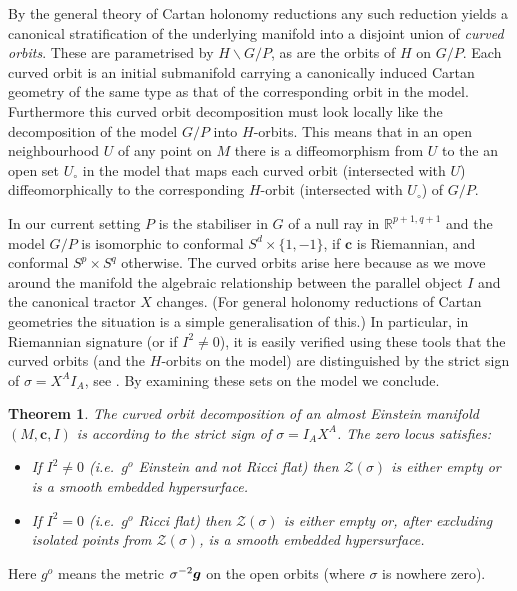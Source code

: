 \documentclass[a4paper,12pt]{amsart}
\newcommand{\cZ}{\mathcal{Z}}
\newcommand{\cc}{\boldsymbol{c}}
\def\bg{\mbox{\boldmath $g$}}
\newcommand{\si}{\sigma}
\newtheorem{theorem}{Theorem}[section]
\theoremstyle{remark}
\begin{document}
By the general theory of Cartan holonomy reductions \cite{CGH} any
such reduction yields a canonical stratification of the underlying
manifold into a disjoint union of {\em curved orbits}. These are
parametrised by $H\backslash G/P$, as are the orbits of $H$ on
$G/P$. Each curved orbit is an initial submanifold carrying a
canonically induced Cartan geometry of the same type as that of the
corresponding orbit in the model. Furthermore this curved orbit
decomposition must look locally like the decomposition of the model
$G/P$ into $H$-orbits. This means that in an open neighbourhood $U$ of
any point on $M$ there is a diffeomorphism from $U$ to the an open set
$U_\circ$ in the model that maps each curved orbit (intersected with
$U$) diffeomorphically to the corresponding $H$-orbit (intersected
with $U_\circ$) of $G/P$.

In our current setting $P$ is the stabiliser in $G$ of a null ray in $\mathbb{R}^{p+1,q+1}$ and the model $G/P$ is isomorphic to conformal $S^d\times \{1,-1\}$, if $\cc$ is Riemannian, and conformal $S^p\times S^q$ otherwise. The curved orbits arise here because as we move
around the manifold the algebraic relationship between the parallel
object $I$ and the canonical tractor $X$ changes. (For general
holonomy reductions of Cartan geometries the situation is a simple
generalisation of this.)  In particular, in Riemannian signature (or if $I^2\neq 0$), it is easily verified using these tools that the curved orbits (and the $H$-orbits on the model) are distinguished by the strict sign of $\si=X^AI_A$, see \cite[Section 3.5]{CGH}. By examining these sets on the model we conclude.
\begin{theorem}\label{AE-dec} The curved orbit decomposition of an 
almost Einstein manifold $(M,\cc,I)$ is according to the strict sign
of $\si=I_AX^A$.  The zero locus satisfies: 
\begin{itemize}[itemsep=2pt]
\item If $I^2\neq 0$ (i.e.\ $g^o$ Einstein and not Ricci flat) then $\cZ(\si)$ is
either empty or is a smooth embedded hypersurface.
\item If $I^2=0$ (i.e.\ $g^o$ Ricci flat) then $\cZ(\si)$ is
either empty or, after excluding isolated points from $\cZ(\si)$, is a smooth embedded hypersurface.
\end{itemize} 
\end{theorem}
\noindent Here $g^o$ means the metric $\si^{-2}\bg$ on the open orbits (where $\si$ is nowhere zero).
\end{document}
